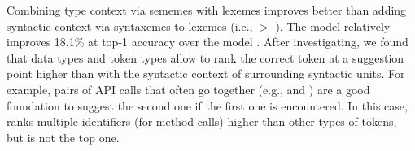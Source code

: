 Combining type context via sememes with lexemes improves
better than adding syntactic context via syntaxemes to lexemes
(i.e.,
 $>$ ). The model 
relatively improves 18.1\% at
top-1 accuracy over the model .
%
After investigating, we found that data types and token types allow
 to rank the correct token at a suggestion point
higher than  with the syntactic context of surrounding
syntactic units. For example, pairs of API calls that often go
together (e.g.,  and ) are a
good foundation to suggest the second one if the first one is
encountered. In this case,  ranks multiple
identifiers (for method calls) higher than other types of
tokens, but  is not the top one.






